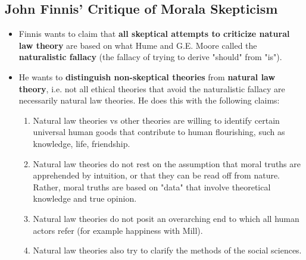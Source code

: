 \documentclass[16pt]{article}
\begin{document}
    \subsection*{John Finnis' Critique of Morala Skepticism}
    \begin{itemize}
        \item Finnis wants to claim that \textbf{all skeptical attempts to criticize natural law theory} are based on what Hume and G.E. Moore called the \textbf{naturalistic fallacy} (the fallacy of trying to derive "should" from "is").
        \item He wants to \textbf{distinguish non-skeptical theories} from \textbf{natural law theory}, i.e. not all ethical theories that avoid the naturalistic fallacy are necessarily natural law theories. He does this with the following claims:
        \begin{enumerate}
            \item Natural law theories vs other theories are willing to identify certain universal human goods that contribute to human flourishing, such as knowledge, life, friendship.
            \item Natural law theories do not rest on the assumption that moral truths are apprehended by intuition, or that they can be read off from nature. Rather, moral truths are based on "data" that involve theoretical knowledge and true opinion.
            \item Natural law theories do not posit an overarching end to which all human actors refer (for example happiness with Mill).
            \item Natural law theories also try to clarify the methods of the social sciences.
        \end{enumerate}
    \end{itemize}
    
\end{document}
